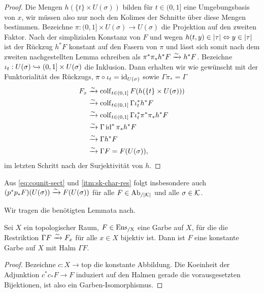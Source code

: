 \begin{proof}
  Die Mengen $h(\{t\} \times U(\sigma))$ bilden für $t \in (0, 1]$
    eine Umgebungsbasis von $x$, wir müssen also nur noch den Kolimes
    der Schnitte über diese Mengen bestimmen. Bezeichne $\pi: (0, 1]
      \times U(\sigma) \to U(\sigma)$ die Projektion auf den zweiten
      Faktor. Nach der simplizialen Konstanz von $F$ und wegen $h(t,
      y) \in |\tau| \Leftrightarrow y \in |\tau|$ ist der Rückzug $h^* F$
      konstant auf den Fasern von $\pi$ und lässt sich somit nach dem
      zweiten nachgestellten Lemma schreiben als $\pi^* \pi_* h^* F
      \xrightarrow[]{\sim} h^* F$. Bezeichne $\iota_t: U(\sigma) \xhookrightarrow{}
      (0, 1] \times U(\sigma)$ die Inklusion. Dann erhalten wir wie
        gewünscht mit der Funktorialität des Rückzugs, $\pi \circ
        \iota_t = \operatorname{id}_{U(\sigma)}$ sowie $\Gamma \pi_* = \Gamma$
   \begin{align*}
     F_x &\xrightarrow[]{\sim} \operatorname{colf}\limits_{t \in (0, 1]} F(h(\{t\} \times U(\sigma))) \\
         &\xrightarrow[]{\sim} \operatorname{colf}\limits_{t \in (0, 1]} \Gamma \iota_t^* h^* F \\
         &\xrightarrow[]{\sim} \operatorname{colf}\limits_{t \in (0, 1]} \Gamma \iota_t^* \pi^* \pi_* h^* F \\
         &\xrightarrow[]{\sim} \Gamma \operatorname{id}^* \pi_* h^* F \\
         &\xrightarrow[]{\sim} \Gamma h^* F \\
         &\xrightarrow[]{\sim} \Gamma F = F(U(\sigma)),
   \end{align*}
   im letzten Schritt nach der Surjektivität von $h$.
\end{proof}
\begin{bem} \label{beta-sect}
  Aus \autoref{eq:counit-sect} und \ref{itm:sk-char-res} folgt
  insbesondere auch $(p^* p_* F)(U(\sigma)) \xrightarrow[]{\sim} F(U(\sigma))$ für
  alle $F \in \operatorname{Ab}_{/|\mathcal{K}|}$ und alle $\sigma \in \mathcal{K}$.
\end{bem}

Wir tragen die benötigten Lemmata nach.

\begin{lemma}[\cite{TG}, 2.1.41] \label{const-stalk}
  Sei $X$ ein topologischer Raum, $F \in \operatorname{Ens_{/X}}$ eine Garbe auf $X$,
  für die die Restriktion $\Gamma F \xrightarrow[]{\sim} F_x$ für alle $x \in X$
  bijektiv ist. Dann ist $F$ eine konstante Garbe auf $X$ mit Halm
  $\Gamma F$.
\end{lemma}
\begin{proof}
  Bezeichne $c: X \to \mathrm{top}$ die konstante Abbildung. Die
  Koeinheit der Adjunktion $c^* c_* F \to F$ induziert auf den Halmen
  gerade die vorausgesetzten Bijektionen, ist also ein
  Garben-Isomorphismus.
\end{proof}

